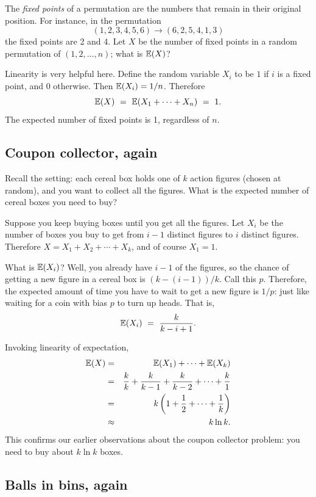 The {\it fixed points} of a permutation are the numbers that remain in their original 
position. For instance, in the permutation
$$ (1,2,3,4,5,6) \rightarrow (6,2,5,4,1,3)$$
the fixed points are 2 and 4. Let $X$ be the number of fixed points in a random 
permutation of $(1,2,\ldots, n)$; what is $\mathbb{E}(X)$?

Linearity is very helpful here. Define the random variable $X_i$ to be $1$ if $i$
is a fixed point, and $0$ otherwise. Then $\mathbb{E}(X_i) = 1/n$. Therefore
$$ \E(X) 
\ = \ 
\E(X_1 + \cdots + X_n)
\ = \ 
1.
$$
The expected number of fixed points is 1, regardless of $n$.

\subsection{Coupon collector, again}

Recall the setting: each cereal box holds one of $k$ action figures (chosen at random), and
you want to collect all the figures. What is the expected number of cereal boxes you need
to buy?

Suppose you keep buying boxes until you get all the figures. Let $X_i$ be the number of 
boxes you buy to get from $i-1$ distinct figures to $i$ distinct figures. Therefore
$X = X_1 + X_2 + \cdots + X_k$, and of course $X_1 = 1$.

What is $\mathbb{E}(X_i)$? Well, you already have $i-1$ of the figures, so the chance of getting
a new figure in a cereal box is $(k-(i-1))/k$. Call this $p$. Therefore, the expected amount 
of time you have to wait to get a new figure is $1/p$: just like waiting for a coin with
bias $p$ to turn up heads. That is,
$$ \E(X_i) \ = \ \frac{k}{k-i+1} .$$

Invoking linearity of expectation,
\begin{eqnarray*}
\mathbb{E}(X) & = & \mathbb{E}(X_1) + \cdots + \mathbb{E}(X_k) \\
      & = & \frac{k}{k} + \frac{k}{k-1} + \frac{k}{k-2} + \cdots + \frac{k}{1} \\
      & = & k \left( 1 + \frac{1}{2} + \cdots + \frac{1}{k} \right) \\
      & \approx & k \ln k.
\end{eqnarray*}
This confirms our earlier observations about the coupon collector problem: you need
to buy about $k \ln k$ boxes.

\subsection{Balls in bins, again}

